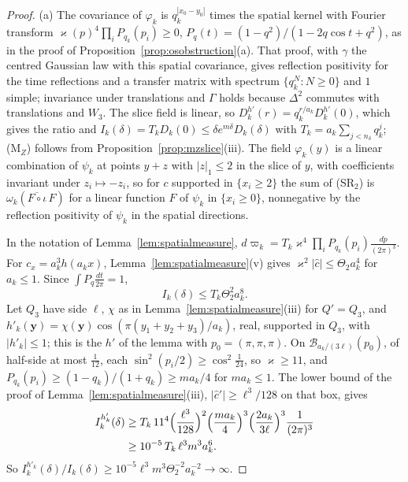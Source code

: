 \documentclass[aps,prd,twocolumn,superscriptaddress,nofootinbib,longbibliography,floatfix,amsmath,amssymb,10pt]{revtex4-2}
\theoremstyle{definition}
\theoremstyle{remark}
\begin{document}
\begin{proof}
(a) The covariance of $\varphi_k$ is $q_k^{|x_0-y_0|}$ times the spatial
kernel with Fourier transform $\varkappa(p)^4\prod_iP_{q_k}(p_i)\ge0$,
$P_q(t)=(1-q^2)/(1-2q\cos t+q^2)$, as in the proof of
Proposition~\ref{prop:osobstruction}(a). That proof, with $\gamma$ the
centred Gaussian law with this spatial covariance, gives reflection
positivity for the time reflections and a transfer matrix with spectrum
$\{q_k^N:N\ge0\}$ and $1$ simple; invariance under translations and
$\Gamma$ holds because $\Delta^2$ commutes with translations and $W_3$. The
slice field is linear, so $D^{h'}_k(r)=q_k^{r/a_k}D^{h'}_k(0)$, which gives
the ratio and
$I_k(\delta)=T_kD_k(0)\le\delta e^{m\delta}D_k(\delta)$ with $T_k=a_k
\sum_{j<n_\delta}q_k^j$; (M$_Z$) follows from
Proposition~\ref{prop:mzslice}(iii). The field $\varphi_k(y)$ is a linear
combination of $\psi_k$ at points $y+z$ with $|z|_1\le2$ in the slice of
$y$, with coefficients invariant under $z_i\mapsto-z_i$, so for $c$
supported in $\{x_i\ge2\}$ the sum of (SR$_2$) is
$\omega_k(\overline{F\circ\iota}\,F)$ for a linear function $F$ of
$\psi_k$ in $\{x_i\ge0\}$, nonnegative by the reflection positivity of
$\psi_k$ in the spatial directions.

In the notation of Lemma~\ref{lem:spatialmeasure},
$d\varpi_k=T_k\varkappa^4\prod_iP_{q_k}(p_i)\frac{dp}{(2\pi)^3}$. For
$c_x=a_k^3h(a_kx)$, Lemma~\ref{lem:spatialmeasure}(v) gives $\varkappa^2|\hat
c|\le\Theta_2a_k^4$ for $a_k\le1$. Since
$\int P_q\frac{dt}{2\pi}=1$,
\[
I_k(\delta)\le T_k\Theta_2^2a_k^8 .
\]
Let $Q_3$ have side $\ell$, $\chi$ as in
Lemma~\ref{lem:spatialmeasure}(iii) for $Q'=Q_3$, and $h'_k(\mathbf y)=
\chi(\mathbf y)\cos(\pi(y_1+y_2+y_3)/a_k)$, real, supported in $Q_3$, with
$|h'_k|\le1$; this is the $h'$ of the lemma with $p_0=(\pi,\pi,\pi)$. On
$\mathcal B_{a_k/(3\ell)}(p_0)$, of half-side at most $\frac1{12}$, each
$\sin^2(p_i/2)\ge\cos^2\frac1{24}$, so $\varkappa\ge11$, and $P_{q_k}(p_i)\ge
(1-q_k)/(1+q_k)\ge ma_k/4$ for $ma_k\le1$. The lower bound of the proof of
Lemma~\ref{lem:spatialmeasure}(iii), $|\hat c'|\ge\ell^3/128$ on that box,
gives
\[
\begin{split}
I^{h'_k}_k(\delta)&\ge T_k\,11^4\Bigl(\frac{\ell^3}{128}\Bigr)^2\Bigl(
\frac{ma_k}4\Bigr)^3\Bigl(\frac{2a_k}{3\ell}\Bigr)^3\frac1{(2\pi)^3}\\
&\ge10^{-5}\,T_k\,\ell^3m^3a_k^6 .
\end{split}
\]
So $I^{h'_k}_k(\delta)/I_k(\delta)\ge10^{-5}\ell^3m^3\Theta_2^{-2}a_k^{-2}
\to\infty$.


\end{proof}
\end{document}
